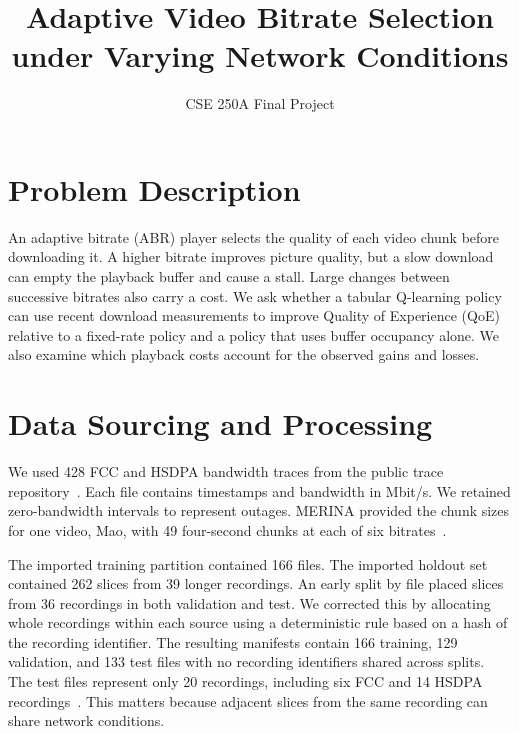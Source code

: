 \documentclass[10pt,letterpaper]{article}
\title{\vspace{-1.2em}Adaptive Video Bitrate Selection\\under Varying Network Conditions}
\author{CSE 250A Final Project}
\date{}
\begin{document}
\maketitle
\vspace{-1.5em}

\section{Problem Description}

An adaptive bitrate (ABR) player selects the quality of each video chunk before
downloading it. A higher bitrate improves picture quality, but a slow download
can empty the playback buffer and cause a stall. Large changes between
successive bitrates also carry a cost. We ask whether a tabular Q-learning
policy can use recent download measurements to improve Quality of Experience
(QoE) relative to a fixed-rate policy and a policy that uses buffer occupancy
alone. We also examine which playback costs account for the observed gains
and losses.

\section{Data Sourcing and Processing}

We used 428 FCC and HSDPA bandwidth traces from the public trace
repository~\cite{traces}. Each file contains timestamps and bandwidth in Mbit/s.
We retained zero-bandwidth intervals to represent outages. MERINA provided the
chunk sizes for one video, Mao, with 49 four-second chunks at each of six
bitrates~\cite{merina}.

The imported training partition contained 166 files. The imported holdout set
contained 262 slices from 39 longer recordings. An early split by file placed
slices from 36 recordings in both validation and test. We corrected this by
allocating whole recordings within each source using a deterministic rule
based on a hash of the recording identifier. The resulting manifests contain
166 training, 129 validation, and 133 test files with no recording identifiers
shared across splits. The test files represent only 20 recordings, including
six FCC and 14 HSDPA recordings~\cite{splits}. This matters because adjacent
slices from the same recording can share network conditions.
\end{document}
